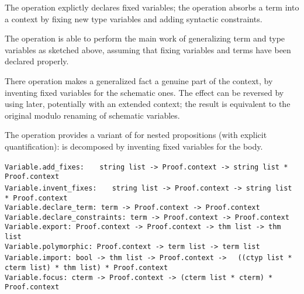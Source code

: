 \begin{isabellebody}
\begin{isamarkuptext}
  The  operation explictly declares fixed
  variables; the  operation absorbs a term into
  a context by fixing new type variables and adding syntactic
  constraints.

  The  operation is able to perform the main work of
  generalizing term and type variables as sketched above, assuming
  that fixing variables and terms have been declared properly.

  There  operation makes a generalized fact a genuine
  part of the context, by inventing fixed variables for the schematic
  ones.  The effect can be reversed by using  later,
  potentially with an extended context; the result is equivalent to
  the original modulo renaming of schematic variables.

  The  operation provides a variant of 
  for nested propositions (with explicit quantification):  is
  decomposed by inventing fixed variables  for the body.%
\end{isamarkuptext}%
\isamarkuptrue%
%
\isadelimmlref
%
\endisadelimmlref
%
\isatagmlref
%
\begin{isamarkuptext}%
\begin{mldecls}
  \verb|Variable.add_fixes: |\isasep\isanewline%
\verb|  string list -> Proof.context -> string list * Proof.context| \\
  \verb|Variable.invent_fixes: |\isasep\isanewline%
\verb|  string list -> Proof.context -> string list * Proof.context| \\
  \verb|Variable.declare_term: term -> Proof.context -> Proof.context| \\
  \verb|Variable.declare_constraints: term -> Proof.context -> Proof.context| \\
  \verb|Variable.export: Proof.context -> Proof.context -> thm list -> thm list| \\
  \verb|Variable.polymorphic: Proof.context -> term list -> term list| \\
  \verb|Variable.import: bool -> thm list -> Proof.context ->|\isasep\isanewline%
\verb|  ((ctyp list * cterm list) * thm list) * Proof.context| \\
  \verb|Variable.focus: cterm -> Proof.context -> (cterm list * cterm) * Proof.context| \\
  \end{mldecls}


\end{isamarkuptext}
\end{isabellebody}
